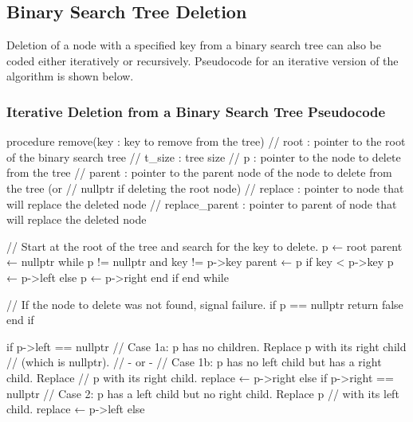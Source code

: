 \documentclass{report}
\begin{document}
    \subsection{Binary Search Tree Deletion}
    \bigbreak \noindent 
    Deletion of a node with a specified key from a binary search tree can also be coded either iteratively or recursively. Pseudocode for an iterative version of the algorithm is shown below.
    \pagebreak 
    \subsubsection{Iterative Deletion from a Binary Search Tree Pseudocode}
    \bigbreak \noindent 
    \begin{cppcode}
procedure remove(key : key to remove from the tree)
    // root           : pointer to the root of the binary search tree
    // t_size         : tree size  
    // p              : pointer to the node to delete from the tree
    // parent         : pointer to the parent node of the node to delete from the tree (or 
    //                  nullptr if deleting the root node)
    // replace        : pointer to node that will replace the deleted node
    // replace_parent : pointer to parent of node that will replace the deleted node
	
    // Start at the root of the tree and search for the key to delete.
    p ← root
    parent ← nullptr
    while p != nullptr and key != p->key
        parent ← p
        if key < p->key
            p ← p->left
        else
            p ← p->right
        end if
    end while
    
    // If the node to delete was not found, signal failure.
    if p == nullptr
        return false
    end if
    
    if p->left == nullptr
        // Case 1a: p has no children. Replace p with its right child
        // (which is nullptr).
        //   - or -
        // Case 1b: p has no left child but has a right child. Replace 
        // p with its right child.
        replace ← p->right
    else if p->right == nullptr
        // Case 2: p has a left child but no right child. Replace p 
        // with its left child.
        replace ← p->left
    else
    \end{cppcode}
    \pagebreak 
\end{document}
